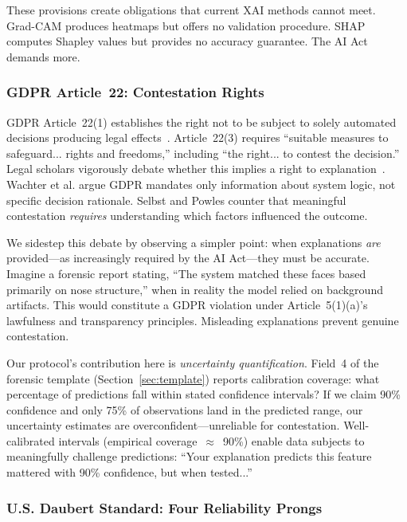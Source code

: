 These provisions create obligations that current XAI methods cannot meet. Grad-CAM produces heatmaps but offers no validation procedure. SHAP computes Shapley values but provides no accuracy guarantee. The AI Act demands more.

\subsubsection{GDPR Article~22: Contestation Rights}

GDPR Article~22(1) establishes the right not to be subject to solely automated decisions producing legal effects~\cite{gdpr2016}. Article~22(3) requires ``suitable measures to safeguard... rights and freedoms,'' including ``the right... to contest the decision.'' Legal scholars vigorously debate whether this implies a right to explanation~\cite{wachter2017right,selbst2017meaningful}. Wachter et al. argue GDPR mandates only information about system logic, not specific decision rationale. Selbst and Powles counter that meaningful contestation \textit{requires} understanding which factors influenced the outcome.

We sidestep this debate by observing a simpler point: when explanations \textit{are} provided—as increasingly required by the AI Act—they must be accurate. Imagine a forensic report stating, ``The system matched these faces based primarily on nose structure,'' when in reality the model relied on background artifacts. This would constitute a GDPR violation under Article~5(1)(a)'s lawfulness and transparency principles. Misleading explanations prevent genuine contestation.

Our protocol's contribution here is \textit{uncertainty quantification}. Field~4 of the forensic template (Section~\ref{sec:template}) reports calibration coverage: what percentage of predictions fall within stated confidence intervals? If we claim 90\% confidence and only 75\% of observations land in the predicted range, our uncertainty estimates are overconfident—unreliable for contestation. Well-calibrated intervals (empirical coverage~$\approx$~90\%) enable data subjects to meaningfully challenge predictions: ``Your explanation predicts this feature mattered with 90\% confidence, but when tested...''

\subsubsection{U.S. Daubert Standard: Four Reliability Prongs}

